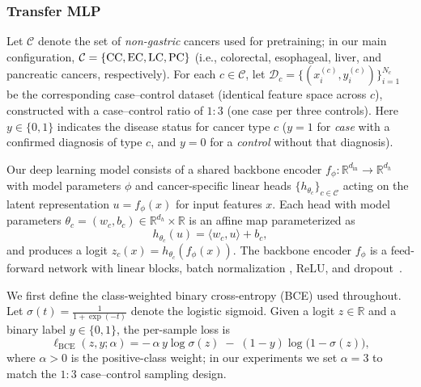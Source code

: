 \documentclass[diagnostics,article,submit,pdftex,moreauthors]{Definitions/mdpi}
\begin{document}
\subsubsection{Transfer MLP}
Let $\mathcal{C}$ denote the set of \emph{non-gastric} cancers used for pretraining; in our main configuration, $\mathcal{C}=\{\mathrm{CC},\mathrm{EC},\mathrm{LC},\mathrm{PC}\}$ (i.e., colorectal, esophageal, liver, and pancreatic cancers, respectively).
For each $c\in\mathcal{C}$, let $\mathcal{D}_c=\{(x_i^{(c)},y_i^{(c)})\}_{i=1}^{N_c}$ be the corresponding case--control dataset (identical feature space across $c$), constructed with a case--control ratio of $1{:}3$ (one case per three controls).
Here $y\in\{0,1\}$ indicates the disease status for cancer type $c$ ($y{=}1$ for \emph{case} with a confirmed diagnosis of type $c$, and $y{=}0$ for a \emph{control} without that diagnosis).

Our deep learning model consists of a shared backbone encoder $f_\phi:\mathbb{R}^{d_{\mathrm{in}}}\!\to\!\mathbb{R}^{d_h}$ with model parameters $\phi$ and cancer-specific linear heads $\{h_{\theta_c}\}_{c\in\mathcal{C}}$ acting on the latent representation $u=f_\phi(x)$ for input features $x$.
Each head with model parameters $\theta_c=(w_c,b_c)\in\mathbb{R}^{d_h}\times\mathbb{R}$ is an affine map parameterized as
\[
h_{\theta_c}(u)=\langle w_c,u\rangle + b_c,
\]
and produces a logit $z_c(x)=h_{\theta_c}(f_\phi(x))$.
The backbone encoder $f_\phi$ is a feed-forward network with linear blocks, batch normalization \citep{Ioffe2015_BN}, ReLU, and dropout~\citep{Srivastava2014_Dropout}.

We first define the class-weighted binary cross-entropy (BCE) used throughout.
Let $\sigma(t)=\frac{1}{1+\exp(-t)}$ denote the logistic sigmoid.
Given a logit $z\in\mathbb{R}$ and a binary label $y\in\{0,1\}$, the per-sample loss is
\begin{equation}
  \label{eq:bce}
  \ell_{\mathrm{BCE}}(z,y;\alpha)
  = -\,\alpha\,y\log \sigma(z)\;-\;(1-y)\log\!\big(1-\sigma(z)\big),
  \end{equation}
where $\alpha>0$ is the positive-class weight; in our experiments we set $\alpha=3$ to match the $1{:}3$ case--control sampling design.
\end{document}
